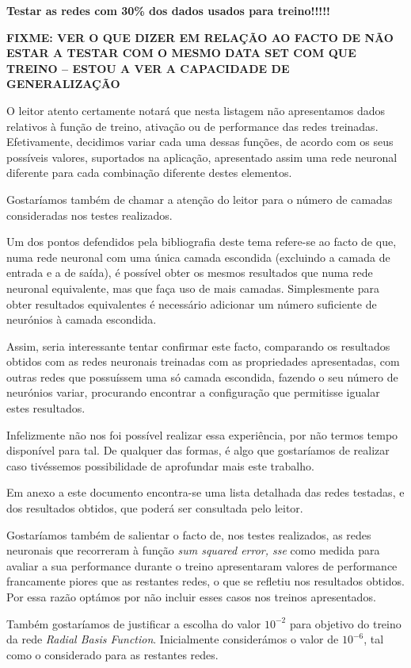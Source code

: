 \documentclass{article}
\begin{document}
\textbf{Testar as redes com 30\% dos dados usados para treino!!!!!}

\textbf{FIXME: VER O QUE DIZER EM RELAÇÃO AO FACTO DE NÃO ESTAR A TESTAR COM O MESMO DATA SET COM QUE TREINO -- ESTOU A VER A CAPACIDADE DE GENERALIZAÇÃO}

O leitor atento certamente notará que nesta listagem não apresentamos dados relativos à função de treino, ativação ou de performance das redes treinadas. Efetivamente, decidimos variar cada uma dessas funções, de acordo com os seus possíveis valores, suportados na aplicação, apresentado assim uma rede neuronal diferente para cada combinação diferente destes elementos.

Gostaríamos também de chamar a atenção do leitor para o número de camadas consideradas nos testes realizados.

Um dos pontos defendidos pela bibliografia deste tema refere-se ao facto de que, numa rede neuronal com uma única camada escondida (excluindo a camada de entrada e a de saída), é possível obter os mesmos resultados que numa rede neuronal equivalente, mas que faça uso de mais camadas. Simplesmente para obter resultados equivalentes é necessário adicionar um número suficiente de neurónios à camada escondida.

Assim, seria interessante tentar confirmar este facto, comparando os resultados obtidos com as redes neuronais treinadas com as propriedades apresentadas, com outras redes que possuíssem uma só camada escondida, fazendo o seu número de neurónios variar, procurando encontrar a configuração que permitisse igualar estes resultados.

Infelizmente não nos foi possível realizar essa experiência, por não termos tempo disponível para tal. De qualquer das formas, é algo que gostaríamos de realizar caso tivéssemos possibilidade de aprofundar mais este trabalho.

Em anexo a este documento encontra-se uma lista detalhada das redes testadas, e dos resultados obtidos, que poderá ser consultada pelo leitor.

Gostaríamos também de salientar o facto de, nos testes realizados, as redes neuronais que recorreram à função \emph{sum squared error, sse} como medida para avaliar a sua performance durante o treino apresentaram valores de performance francamente piores que as restantes redes, o que se refletiu nos resultados obtidos. Por essa razão optámos por não incluir esses casos nos treinos apresentados.

Também gostaríamos de justificar a escolha do valor $10^{-2}$ para objetivo do treino da rede \emph{Radial Basis Function}. Inicialmente considerámos o valor de $10^{-6}$, tal como o considerado para as restantes redes.
\end{document}
